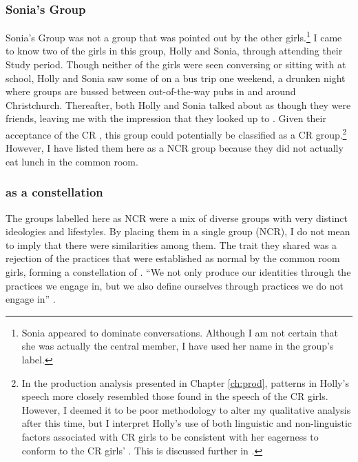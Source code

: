 

\subsubsection{Sonia's Group}

Sonia's Group was not a group that was pointed out by the other girls.\footnote{Sonia appeared to dominate conversations. Although I am not certain that she was actually the central member, I have used her name in the group's label.}  I came to know two of the girls in this group, Holly and Sonia, through attending their Study period. Though neither of the girls were seen conversing or sitting with  at school, Holly and Sonia saw some of  on a bus trip one weekend, a drunken night where groups are bussed between out-of-the-way pubs in and around Christchurch. Thereafter, both Holly and Sonia talked about  as though they were friends, leaving me with the impression that they looked up to . Given their acceptance of the CR , this group could potentially be classified as a CR group.\footnote{In the production analysis presented in Chapter \ref{ch:prod}, patterns in Holly's speech more closely resembled those found in the speech of the CR girls. However, I deemed it to be poor methodology to alter my qualitative analysis after this time,  but I interpret Holly's use of both linguistic and non-linguistic factors associated with CR girls to be consistent with her eagerness to conform to the CR girls' . This is discussed further in .}  However, I have listed them here as a NCR group because they did not actually eat lunch in the common room.

\subsubsection{ as a constellation}

The groups labelled here as NCR were a mix of diverse groups with very distinct ideologies and lifestyles. By placing them in a single group (NCR), I do not mean to imply that there were similarities among them. The trait they shared was a rejection of the practices that were established as normal by the common room girls, forming a constellation of .	``We not only produce our identities through the practices we engage in, but we also define ourselves through practices we do not engage in'' \citep[164]{wenger1998}.

